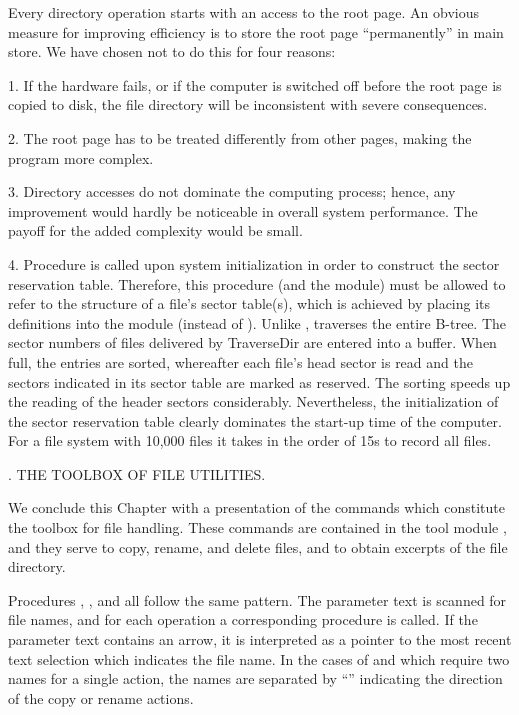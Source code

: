 Every directory operation starts with an access to the root page. An obvious measure for improving efficiency is to store the root page ``permanently'' in main store. We have chosen not to do this for four reasons:

1. If the hardware fails, or if the computer is switched off before the root page is copied to disk, the file directory will be inconsistent with severe consequences.

2. The root page has to be treated differently from other pages, making the program more complex.

3. Directory accesses do not dominate the computing process; hence, any improvement would hardly be noticeable in overall system performance. The payoff for the added complexity would be small.

4. Procedure  is called upon system initialization in order to construct the sector reservation table. Therefore, this procedure (and the module) must be allowed to refer to the structure of a file's sector table(s), which is achieved by placing its definitions into the module  (instead of ). Unlike ,  traverses the entire B-tree. The sector numbers of files delivered by TraverseDir are entered into a buffer. When full, the entries are sorted, whereafter each file's head sector is read and the sectors indicated in its sector table are marked as reserved. The sorting speeds up the reading of the header sectors considerably. Nevertheless, the initialization of the sector reservation table clearly dominates the start-up time of the computer. For a file system with 10,000 files it takes in the order of 15s to record all files.

. THE TOOLBOX OF FILE UTILITIES.

We conclude this Chapter with a presentation of the commands which constitute the toolbox for file handling. These commands are contained in the tool module , and they serve to copy, rename, and delete files, and to obtain excerpts of the file directory.

Procedures , , and  all follow the same pattern. The parameter text is scanned for file names, and for each operation a corresponding procedure is called. If the parameter text contains an arrow, it is interpreted as a pointer to the most recent text selection which indicates the file name. In the cases of  and  which require two names for a single action, the names are separated by ``\code{=>}'' indicating the direction of the copy or rename actions.

